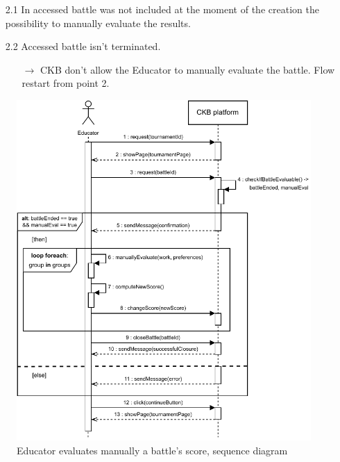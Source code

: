\documentclass{article}
\begin{document}
{\begin{enumerate}
\begin{xltabular}{\textwidth}
\begin{itemize}
                                                    \item[2.1] In accessed battle was not included at the moment of the creation
                                                    the possibility to manually evaluate the results.
                                                    \item[2.2] Accessed battle isn't terminated.
                                                    \begin{itemize}
                                                        \item[$\rightarrow$] CKB don't allow the Educator to manually evaluate
                                                        the battle. Flow restart from point 2.
                                                    \end{itemize} 
                                                \end{itemize}
                    \end{xltabular}
                    
                    \begin{figure}[H]
                        \centering
                        \includegraphics[scale=0.95]{images/SequenceDiagrams/Sequence8.pdf}
                        \caption{Educator evaluates manually a battle's score, sequence diagram}
                        \label{fig:BattleEvalSeqDiagram}
                    \end{figure}


\end{enumerate}}
\end{document}
